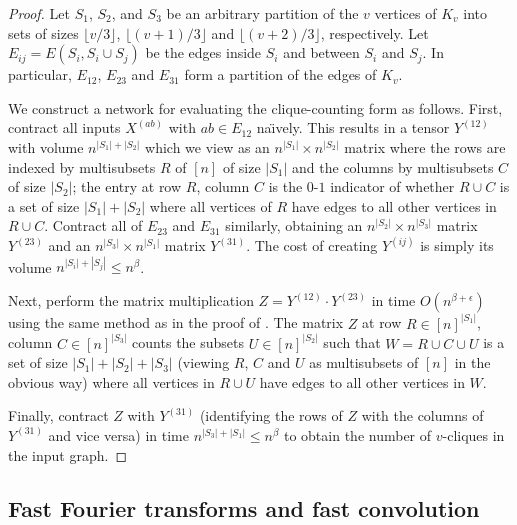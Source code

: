 \documentclass{toc}
\begin{document}
\begin{proof}
  Let $S_1$, $S_2$, and $S_3$ be an arbitrary partition of the $v$
  vertices of $K_v$ into sets of sizes $\lfloor v/3 \rfloor$, $\lfloor
  (v+1)/3 \rfloor$ and $\lfloor (v+2)/3 \rfloor$, respectively.
  Let $E_{ij} = E(S_i, S_i \cup S_j)$ be the edges inside $S_i$ and
  between $S_i$ and $S_j$.  In particular, $E_{12}$, $E_{23}$ and $E_{31}$
  form a partition of the edges of $K_v$.

  We construct a network for evaluating the clique-counting form as
  follows.  First, contract all inputs $X^{(ab)}$ with $ab \in E_{12}$
  na\"\i{}vely.  This results in a tensor $Y^{(12)}$ with volume $n^{|S_1|
    + |S_2|}$ which we view as an $n^{|S_1|} \times n^{|S_2|}$ matrix
  where the rows are indexed by multisubsets $R$ of $[n]$ of size $|S_1|$
  and the columns by multisubsets $C$ of size $|S_2|$; the entry at
  row $R$, column $C$ is the $0$-$1$ indicator of whether $R \cup C$ is
  a set of size $|S_1|+|S_2|$ where all vertices of $R$ have edges to
  all other vertices in $R \cup C$.
  Contract all of $E_{23}$ and
  $E_{31}$ similarly, obtaining an $n^{|S_2|} \times n^{|S_3|}$ matrix
  $Y^{(23)}$ and an $n^{|S_3|} \times n^{|S_1|}$ matrix $Y^{(31)}$.
  The cost of creating $Y^{(ij)}$ is simply its volume $n^{|S_i|+|S_j|} \le n^{\beta}$.

  Next, perform the matrix multiplication $Z = Y^{(12)} \cdot Y^{(23)}$ in
  time $O(n^{\beta + \epsilon})$ using the same method as in the proof
  of .  The matrix $Z$ at row $R
  \in [n]^{|S_1|}$, column $C \in [n]^{|S_3|}$ counts the 
%
  subsets $U\in [n]^{|S_2|}$ such that $W = R \cup C \cup U$ is a set of
  size $|S_1| + |S_2| + |S_3|$ (viewing $R$, $C$ and $U$ as multisubsets of
  $[n]$ in the obvious way) where all vertices in $R \cup U$ have
  edges to all other vertices in $W$.

  Finally, contract $Z$ with $Y^{(31)}$ (identifying the rows of
  $Z$ with the columns of $Y^{(31)}$ and vice versa) in time $n^{|S_3|
    + |S_1|} \le n^{\beta}$ to obtain the number of $v$-cliques in the
  input graph.
\end{proof}





\subsection{Fast Fourier transforms and fast convolution}

\label{sect:fft}
\end{document}

